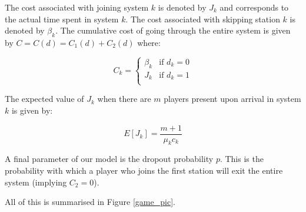 \documentclass[12pt]{article}
\begin{document}
The cost associated with joining system $k$ is denoted by $J_k$ and corresponds to the actual time spent in system $k$.
The cost associated with skipping station $k$ is denoted by $\beta_k$.
The cumulative cost of going through the entire system is given by $C=C(d)=C_1(d)+C_2(d)$ where:

\begin{equation}\label{eq:actualcost}
C_{k} = \begin{cases}
        \beta_k&\text{if }d_k=0\\
        J_k&\text{if }d_k=1\\
        \end{cases}
\end{equation}

The expected value of $J_k$ when there are $m$ players present upon arrival in system $k$ is given by:

\begin{equation} \label{eq:expect}
	E[J_{k}] = \frac{m+1}{\mu_k c_k}
\end{equation}

A final parameter of our model is the dropout probability $p$.
This is the probability with which a player who joins the first station will exit the entire system (implying $C_2=0$).

All of this is summarised in Figure \ref{game_pic}.
\end{document}
